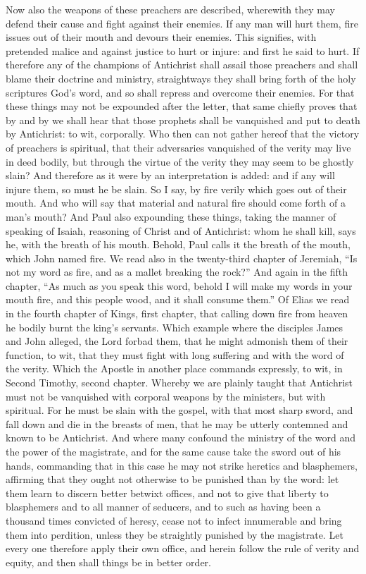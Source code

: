 Now also the weapons of these preachers are described, wherewith they may defend their cause and fight against their enemies. If any man will hurt them, fire issues out of their mouth and devours their enemies. This signifies, with pretended malice and against justice to hurt or injure: and first he said to hurt. If therefore any of the champions of Antichrist shall assail those preachers and shall blame their doctrine and ministry, straightways they shall bring forth of the holy scriptures God’s word, and so shall repress and overcome their enemies. For that these things may not be expounded after the letter, that same chiefly proves that by and by we shall hear that those prophets shall be vanquished and put to death by Antichrist: to wit, corporally. Who then can not gather hereof that the victory of preachers is spiritual, that their adversaries vanquished of the verity may live in deed bodily, but through the virtue of the verity they may seem to be ghostly slain? And therefore as it were by an interpretation is added: and if any will injure them, so must he be slain. So I say, by fire verily which goes out of their mouth. And who will say that material and natural fire should come forth of a man’s mouth? And Paul also expounding these things, taking the manner of speaking of Isaiah, reasoning of Christ and of Antichrist: whom he shall kill, says he, with the breath of his mouth. Behold, Paul calls it the breath of the mouth, which John named fire. We read also in the twenty-third chapter of Jeremiah, “Is not my word as fire, and as a mallet breaking the rock?” And again in the fifth chapter, “As much as you speak this word, behold I will make my words in your mouth fire, and this people wood, and it shall consume them.” Of Elias we read in the fourth chapter of Kings, first chapter, that calling down fire from heaven he bodily burnt the king’s servants. Which example where the disciples James and John alleged, the Lord forbad them, that he might admonish them of their function, to wit, that they must fight with long suffering and with the word of the verity. Which the Apostle in another place commands expressly, to wit, in Second Timothy, second chapter. Whereby we are plainly taught that Antichrist must not be vanquished with corporal weapons by the ministers, but with spiritual. For he must be slain with the gospel, with that most sharp sword, and fall down and die in the breasts of men, that he may be utterly contemned and known to be Antichrist. And where many confound the ministry of the word and the power of the magistrate, and for the same cause take the sword out of his hands, commanding that in this case he may not strike heretics and blasphemers, affirming that they ought not otherwise to be punished than by the word: let them learn to discern better betwixt offices, and not to give that liberty to blasphemers and to all manner of seducers, and to such as having been a thousand times convicted of heresy, cease not to infect innumerable and bring them into perdition, unless they be straightly punished by the magistrate. Let every one therefore apply their own office, and herein follow the rule of verity and equity, and then shall things be in better order.

